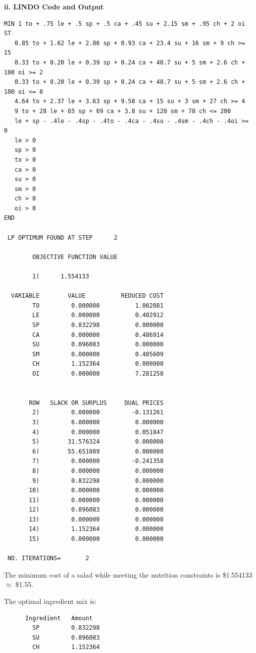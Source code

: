 \documentclass[paper=a4, fontsize=11pt]{scrartcl} %
\numberwithin{equation}{section} %
\numberwithin{figure}{section} %
\numberwithin{table}{section} %
\begin{document}
    \textbf{ii. LINDO Code and Output}
    \begin{verbatim}
MIN 1 to + .75 le + .5 sp + .5 ca + .45 su + 2.15 sm + .95 ch + 2 oi
ST
   0.85 to + 1.62 le + 2.86 sp + 0.93 ca + 23.4 su + 16 sm + 9 ch >= 15
   0.33 to + 0.20 le + 0.39 sp + 0.24 ca + 48.7 su + 5 sm + 2.6 ch + 100 oi >= 2
   0.33 to + 0.20 le + 0.39 sp + 0.24 ca + 48.7 su + 5 sm + 2.6 ch + 100 oi <= 8
   4.64 to + 2.37 le + 3.63 sp + 9.58 ca + 15 su + 3 sm + 27 ch >= 4
   9 to + 28 le + 65 sp + 69 ca + 3.8 su + 120 sm + 78 ch <= 200
   le + sp - .4le - .4sp - .4to - .4ca - .4su - .4sm - .4ch - .4oi >= 0
   le > 0
   sp > 0
   to > 0
   ca > 0
   su > 0
   sm > 0
   ch > 0
   oi > 0
END

 LP OPTIMUM FOUND AT STEP      2

        OBJECTIVE FUNCTION VALUE

        1)      1.554133

  VARIABLE        VALUE          REDUCED COST
        TO         0.000000          1.002081
        LE         0.000000          0.402912
        SP         0.832298          0.000000
        CA         0.000000          0.486914
        SU         0.096083          0.000000
        SM         0.000000          0.405609
        CH         1.152364          0.000000
        OI         0.000000          7.281258


       ROW   SLACK OR SURPLUS     DUAL PRICES
        2)         0.000000         -0.131261
        3)         6.000000          0.000000
        4)         0.000000          0.051847
        5)        31.576324          0.000000
        6)        55.651089          0.000000
        7)         0.000000         -0.241358
        8)         0.000000          0.000000
        9)         0.832298          0.000000
       10)         0.000000          0.000000
       11)         0.000000          0.000000
       12)         0.096083          0.000000
       13)         0.000000          0.000000
       14)         1.152364          0.000000
       15)         0.000000          0.000000

 NO. ITERATIONS=       2
    \end{verbatim}
    
    The minimum cost of a salad while meeting the nutrition constraints is \$1.554133 $\approx$ \$1.55.

The optimal ingredient mix is:
    \begin{verbatim}
	  Ingredient   Amount
        SP         0.832298
        SU         0.096083
        CH         1.152364
    \end{verbatim}
    
\end{document}
